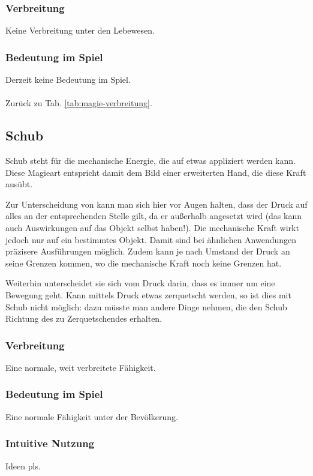 \subsubsection{Verbreitung}
Keine Verbreitung unter den Lebewesen.

\subsubsection{Bedeutung im Spiel}
Derzeit keine Bedeutung im Spiel.
\\ \\
Zurück zu Tab. \ref{tab:magie-verbreitung}.



\subsection{Schub}\label{sec:schubmagie}
Schub steht für die mechanische Energie, die auf etwas appliziert werden kann.
Diese Magieart entspricht damit dem Bild einer erweiterten Hand, die diese Kraft ausübt.


Zur Unterscheidung von  kann man sich hier vor Augen halten, dass der Druck auf alles an der entsprechenden Stelle gilt, da er außerhalb angesetzt wird (das kann auch Auswirkungen auf das Objekt selbst haben!). 
Die mechanische Kraft wirkt jedoch nur auf ein bestimmtes Objekt.
Damit sind bei ähnlichen Anwendungen präzisere Ausführungen möglich.
Zudem kann je nach Umstand der Druck an seine Grenzen kommen, wo die mechanische Kraft noch keine Grenzen hat.

Weiterhin unterscheidet sie sich vom Druck darin, dass es immer um eine Bewegung geht.
Kann mittels Druck etwas zerquetscht werden, so ist dies mit Schub nicht möglich: dazu müsste man andere Dinge nehmen, die den Schub Richtung des zu Zerquetschendes erhalten.

\subsubsection{Verbreitung}
Eine normale, weit verbreitete Fähigkeit.

\subsubsection{Bedeutung im Spiel}
Eine normale Fähigkeit unter der Bevölkerung.

\subsubsection{Intuitive Nutzung}
Ideen pls.

